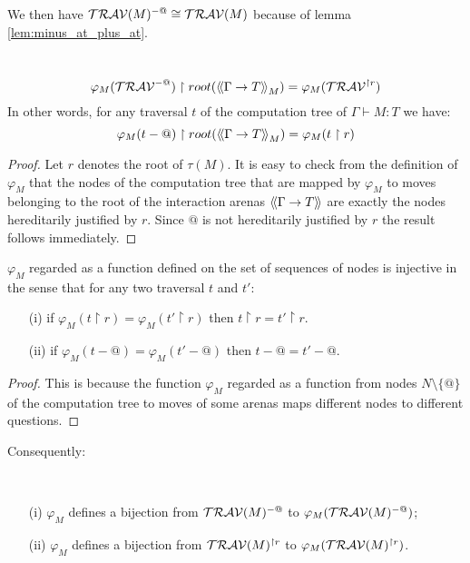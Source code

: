 We then have $\mathcal{TRAV}(M)^{-@} \cong \mathcal{TRAV}(M)$ because of lemma \ref{lem:minus_at_plus_at}.

\begin{lem} \
\label{lem:varphi_filter}
$$ \varphi_M(\mathcal{TRAV}^{-@}) \upharpoonright root({\langle\!\langle \Gamma \rightarrow T \rangle\!\rangle}_M) = \varphi_M(\mathcal{TRAV}^{\upharpoonright r}) $$
In other words, for any traversal $t$ of the computation tree of $\Gamma \vdash M :T$ we have:
$$\varphi_M(t-@) \upharpoonright root({\langle\!\langle \Gamma \rightarrow T \rangle\!\rangle}_M) = \varphi_M(t\upharpoonright r)$$
\end{lem}
\begin{proof}
    Let $r$ denotes the root of $\tau(M)$.
    It is easy to check from the definition of $\varphi_M$ that the nodes of the computation tree that are mapped by $\varphi_M$
    to moves belonging to the root of the interaction arenas ${\langle\!\langle \Gamma \rightarrow T \rangle\!\rangle}$ are
    exactly the nodes hereditarily justified by $r$.
    Since $@$ is not hereditarily justified by $r$ the result follows immediately.
\end{proof}


\begin{lem}
$\varphi_M$ regarded as a function defined on the set of
sequences of nodes is injective in the sense that for any two traversal $t$ and $t'$:
\begin{itemize}
\item[(i)] if $\varphi_M (t \upharpoonright r ) = \varphi_M (t' \upharpoonright r )$ then $t\upharpoonright r = t'\upharpoonright r$.
\item[(ii)] if $\varphi_M (t - @ ) = \varphi_M (t' - @ )$ then $t-@ =t' -@$.
\end{itemize}
\end{lem}
\begin{proof}
This is because the function $\varphi_M$ regarded as a function from nodes $N\setminus\{@\}$ of the computation tree
to moves of some arenas maps different nodes to different questions.
\end{proof}

Consequently:
\begin{cor} \
\label{cor:varphi_bij}
\begin{itemize}
\item[(i)] $\varphi_M$ defines a bijection from $\mathcal{TRAV}(M)^{-@}$
to $\varphi_M(\mathcal{TRAV}(M)^{-@})$;
\item[(ii)] $\varphi_M$ defines a bijection from $\mathcal{TRAV}(M)^{\upharpoonright r}$ to
$\varphi_M(\mathcal{TRAV}(M)^{\upharpoonright r})$.
\end{itemize}
\end{cor}







